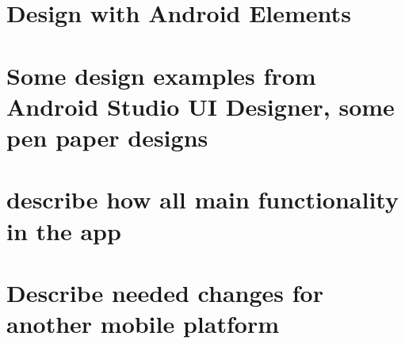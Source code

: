 \documentclass[a4paper,11pt,twoside]{article}
\begin{document}
\section{Design with Android Elements}
\section{Some design examples from Android Studio UI Designer, some pen paper designs}
\section{describe how all main functionality in the app}
\section{Describe needed changes for another mobile platform}



\end{document}
